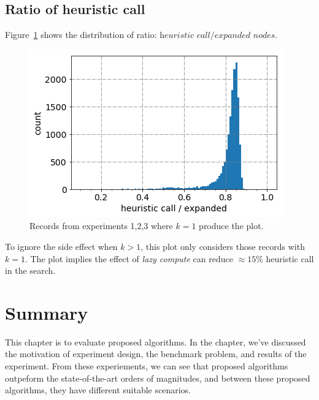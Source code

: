\subsection{Ratio of heuristic call}
Figure~\ref{lazy_compute} shows the distribution of ratio:
$\textit{heuristic call} / \textit{expanded nodes}$.
\begin{figure}[htp]
  \centering
  \includegraphics[width=.7\linewidth]{./pic/lazy_compute.png}
  \caption{\small Records from experiments 1,2,3 where $k=1$ produce the plot.}
  \label{lazy_compute}
\end{figure}
To ignore the side effect when $k>1$, this plot only considers those records with $k=1$.
The plot implies the effect of \textit{lazy compute} can reduce $\approx 15\%$ heuristic call in
the search.

\section{Summary}
This chapter is to evaluate proposed algorithms.
In the chapter, we've discussed the motivation of experiment design,
the benchmark problem, and results of the experiment.
From these experiements, we can see that proposed algorithms outpeform the state-of-the-art
orders of magnitudes, and between these proposed algorithms, they have different suitable
scenarios.

